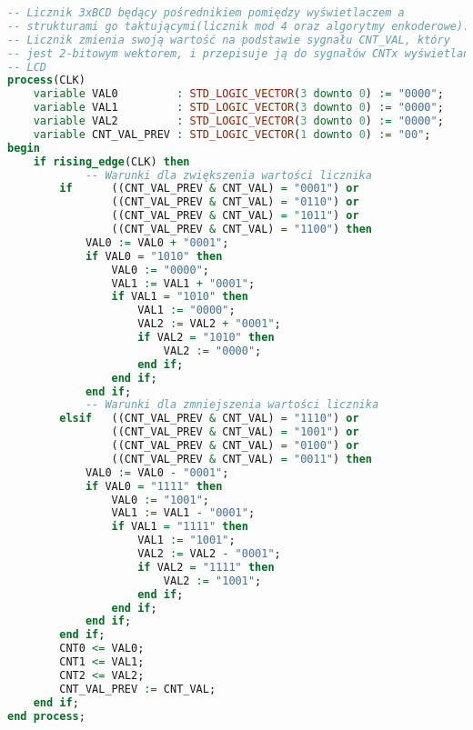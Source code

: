 \documentclass[12pt]{article}
\begin{document}



\begin{lstlisting}[language=VHDL, style=mystyle]
-- Licznik 3xBCD będący pośrednikiem pomiędzy wyświetlaczem a
-- strukturami go taktującymi(licznik mod 4 oraz algorytmy enkoderowe).
-- Licznik zmienia swoją wartość na podstawie sygnału CNT_VAL, który
-- jest 2-bitowym wektorem, i przepisuje ją do sygnałów CNTx wyświetlanych na
-- LCD 
process(CLK)
    variable VAL0         : STD_LOGIC_VECTOR(3 downto 0) := "0000";
    variable VAL1         : STD_LOGIC_VECTOR(3 downto 0) := "0000";
    variable VAL2         : STD_LOGIC_VECTOR(3 downto 0) := "0000";
    variable CNT_VAL_PREV : STD_LOGIC_VECTOR(1 downto 0) := "00";
begin
    if rising_edge(CLK) then
            -- Warunki dla zwiększenia wartości licznika
        if      ((CNT_VAL_PREV & CNT_VAL) = "0001") or
                ((CNT_VAL_PREV & CNT_VAL) = "0110") or
                ((CNT_VAL_PREV & CNT_VAL) = "1011") or
                ((CNT_VAL_PREV & CNT_VAL) = "1100") then
            VAL0 := VAL0 + "0001";
            if VAL0 = "1010" then
                VAL0 := "0000";
                VAL1 := VAL1 + "0001";
                if VAL1 = "1010" then
                    VAL1 := "0000";
                    VAL2 := VAL2 + "0001";
                    if VAL2 = "1010" then
                        VAL2 := "0000";
                    end if;
                end if;
            end if;
            -- Warunki dla zmniejszenia wartości licznika
        elsif   ((CNT_VAL_PREV & CNT_VAL) = "1110") or
                ((CNT_VAL_PREV & CNT_VAL) = "1001") or
                ((CNT_VAL_PREV & CNT_VAL) = "0100") or
                ((CNT_VAL_PREV & CNT_VAL) = "0011") then
            VAL0 := VAL0 - "0001";
            if VAL0 = "1111" then
                VAL0 := "1001";
                VAL1 := VAL1 - "0001";
                if VAL1 = "1111" then
                    VAL1 := "1001";
                    VAL2 := VAL2 - "0001";
                    if VAL2 = "1111" then
                        VAL2 := "1001";
                    end if;
                end if;
            end if;
        end if;
        CNT0 <= VAL0;
        CNT1 <= VAL1;
        CNT2 <= VAL2;
        CNT_VAL_PREV := CNT_VAL;
    end if;
end process;


\end{lstlisting}
\end{document}
